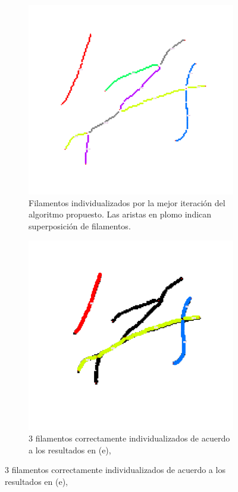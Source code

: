 \begin{figure}[h!]
    \begin{subfigure}[t]{0.47\textwidth}
        \centering
        \includegraphics[scale=0.13]{resultImages/Synth-QuantitativeIFS-Fig7-phil-s1271-v05-nobg-antLabeled.png}
        \caption{Filamentos individualizados por la mejor iteraci\'on del algoritmo propuesto. Las aristas en plomo indican superposici\'on de filamentos.}
        \label{fig:SynthQFS7-Individualizacion}
    \end{subfigure}
    \hspace{0.2cm}
    \begin{subfigure}[t]{0.47\textwidth}
        \centering
        \includegraphics[scale=0.13]{resultImages/Synth-QuantitativeIFS-Fig7-phil-s1271-v05-exactMatch-antLabeled.png}
        \caption{3 filamentos correctamente individualizados de acuerdo a los resultados en (e),}
        \label{fig:SynthQFS7-Individualizacion-Best}
    \end{subfigure}
        

\end{figure}
